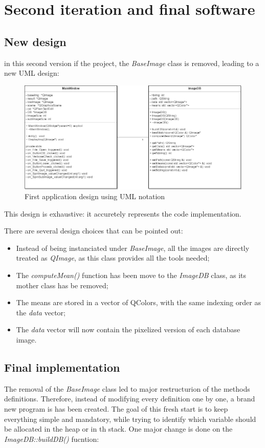 \documentclass[aps,letterpaper,11pt]{revtex4}
\begin{document}
\section{Second iteration and final software}
\subsection{New design}
in this second version if the project, the \textit{BaseImage} class is removed, leading to a new UML design:

\begin{figure}[H]
	\centering
	\includegraphics[width=15cm]{Final_UML.png}
	\caption{First application design using UML notation}
	\label{fig: FirstUML}    
\end{figure}

This design is exhaustive: it accuretely represents the code implementation.

There are several design choices that can be pointed out:

\begin{itemize}
  \item Instead of being instanciated under \textit{BaseImage}, all the images are directly treated as \textit{QImage}, as this class provides all the tools needed;
  \item The \textit{computeMean()} function has been move to the \textit{ImageDB} class, as its mother class has be removed;
  \item The means are stored in a vector of QColors, with the same indexing order as the \textit{data} vector;
  \item The \textit{data} vector will now contain the pixelized version of each database image.
\end{itemize}

\subsection{Final implementation}
The removal of the \textit{BaseImage} class led to major restructurion of the methods definitions. Therefore, instead of modifying every definition one by one, a brand new program is has been created. The goal of this fresh start is to keep everything simple and mandatory, while trying to identify which variable should be allocated in the heap or in th stack.
One major change is done on the \textit{ImageDB::buildDB()} fucntion:
\end{document}
